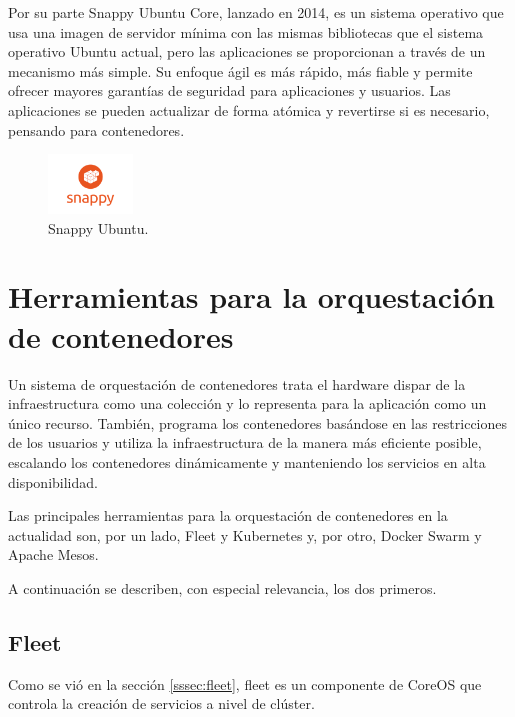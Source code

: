 Por su parte Snappy Ubuntu Core, lanzado en 2014, es un sistema operativo que usa una imagen de servidor mínima con las mismas bibliotecas que el sistema operativo Ubuntu actual, pero las aplicaciones se proporcionan a través de un mecanismo más simple. Su enfoque ágil es más rápido, más fiable y permite ofrecer mayores garantías de seguridad para aplicaciones y usuarios. Las aplicaciones se pueden actualizar de forma atómica y revertirse si es necesario, pensando para contenedores.

\begin{figure}[H]
\centering
\includegraphics[width=0.2\textwidth]{images/figures/snappyubuntu.png}
\caption{Snappy Ubuntu.\label{fig:figure_placement_example}}
\end{figure}

\section{Herramientas para la orquestación de contenedores} \label{sec:herramientas}

Un sistema de orquestación de contenedores trata el hardware dispar de la infraestructura como una colección y lo representa para la aplicación como un único recurso. También, programa los contenedores basándose en las restricciones de los usuarios y utiliza la infraestructura de la manera más eficiente posible, escalando los contenedores dinámicamente y manteniendo los servicios en alta disponibilidad.

Las principales herramientas para la orquestación de contenedores en la actualidad son, por un lado, Fleet y Kubernetes y, por otro, Docker Swarm y Apache Mesos.

A continuación se describen, con especial relevancia, los dos primeros.

\subsection{Fleet}

Como se vió en la sección \ref{sssec:fleet}, fleet es un componente de CoreOS que controla la creación de servicios a nivel de clúster.

